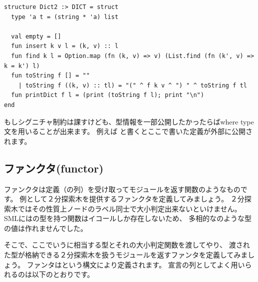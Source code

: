 \documentclass[11pt,a4paper]{jarticle}
\begin{document}
\begin{lstlisting}[caption=リストによる辞書の実装,label=code:list-dict]
structure Dict2 :> DICT = struct
  type 'a t = (string * 'a) list

  val empty = []
  fun insert k v l = (k, v) :: l
  fun find k l = Option.map (fn (k, v) => v) (List.find (fn (k', v) => k = k') l)
  fun toString f [] = ""
    | toString f ((k, v) :: tl) = "(" ^ f k v ^ ") " ^ toString f tl
  fun printDict f l = (print (toString f l); print "\n")
end
\end{lstlisting}

もしシグニチャ制約は課すけども、型情報を一部公開したかったらばwhere type文を用いることが出来ます。
例えば
と書くとここで書いた定義が外部に公開されます。

\subsection{ファンクタ(functor)}

ファンクタは定義（の列）を受け取ってモジュールを返す関数のようなものです。
例として２分探索木を提供するファンクタを定義してみましょう。
２分探索木ではその性質上ノードのラベル同士で大小判定出来ないといけません。
SMLにはの型を持つ関数はイコールしか存在しないため、
多相的なのような型の値は作れませんでした。

そこで、ここでいうに相当する型とそれの大小判定関数を渡してやり、
渡された型が格納できる２分探索木を扱うモジュールを返すファンタを定義してみましょう。
ファンタはという構文により定義されます。
宣言の列としてよく用いられるのは以下のとおりです。
\end{document}

